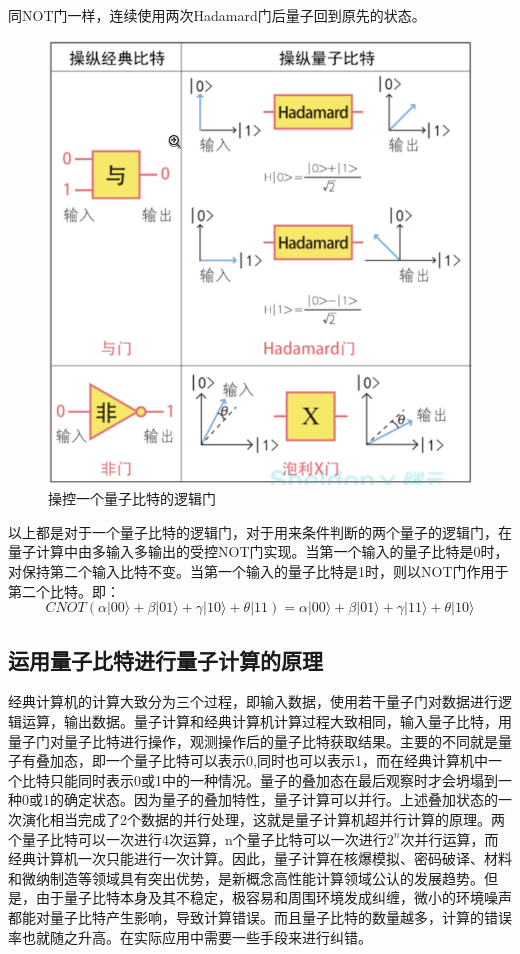 \documentclass{article}
\begin{document}
同NOT门一样，连续使用两次Hadamard门后量子回到原先的状态。
\begin{figure}[H]
  \centering
  \includegraphics[width=0.6\linewidth]{figures/操控一个量子比特的逻辑门}
  \caption{操控一个量子比特的逻辑门}
\end{figure}
以上都是对于一个量子比特的逻辑门，对于用来条件判断的两个量子的逻辑门，在量子计算中由多输入多输出的受控NOT门实现。当第一个输入的量子比特是0时，对保持第二个输入比特不变。当第一个输入的量子比特是1时，则以NOT门作用于第二个比特。即：
\begin{equation}
  \label{}
CNOT(\alpha | 00 \rangle + \beta | 01 \rangle + \gamma | 10 \rangle + \theta | 11) = \alpha | 00 \rangle + \beta | 01 \rangle + \gamma | 11 \rangle + \theta | 10 \rangle
\end{equation}




\subsection{运用量子比特进行量子计算的原理}
\label{subsec:label}
经典计算机的计算大致分为三个过程，即输入数据，使用若干量子门对数据进行逻辑运算，输出数据。量子计算和经典计算机计算过程大致相同，输入量子比特，用量子门对量子比特进行操作，观测操作后的量子比特获取结果。主要的不同就是量子有叠加态，即一个量子比特可以表示0,同时也可以表示1，而在经典计算机中一个比特只能同时表示0或1中的一种情况。量子的叠加态在最后观察时才会坍塌到一种0或1的确定状态。因为量子的叠加特性，量子计算可以并行。上述叠加状态的一次演化相当完成了2个数据的并行处理，这就是量子计算机超并行计算的原理。两个量子比特可以一次进行4次运算，n个量子比特可以一次进行$2^{n}$次并行运算，而经典计算机一次只能进行一次计算。因此，量子计算在核爆模拟、密码破译、材料和微纳制造等领域具有突出优势，是新概念高性能计算领域公认的发展趋势。但是，由于量子比特本身及其不稳定，极容易和周围环境发成纠缠，微小的环境噪声都能对量子比特产生影响，导致计算错误。而且量子比特的数量越多，计算的错误率也就随之升高。在实际应用中需要一些手段来进行纠错。
\end{document}
